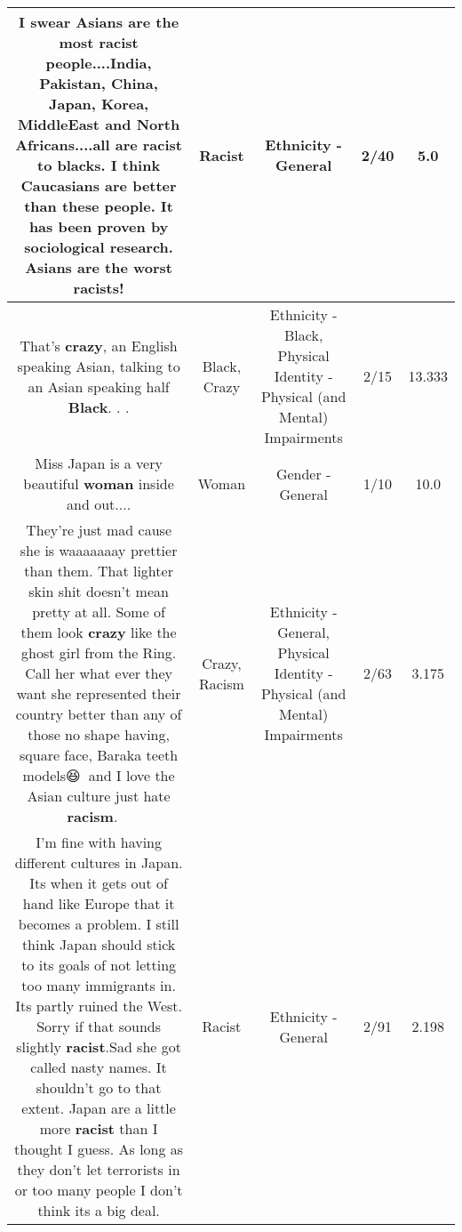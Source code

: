 \documentclass[11pt]{article}
\newlength\mylength
\begin{document}
\begin{center}
\begin{longtable}{|C{.65\mylength}|C{.30\mylength}|C{.12\mylength}|C{.12\mylength}|C{.12\mylength}|}
  \small I swear Asians are the most \textbf{racist} people....India, Pakistan, China, Japan, Korea, MiddleEast and North Africans....all are \textbf{racist} to blacks. I think Caucasians are better than these people. It has been proven by sociological research. Asians are the worst racists!\normalsize   & Racist & Ethnicity - General & 2/40 & 5.0 \\  \hline
  \small That's \textbf{crazy}, an English speaking Asian, talking to an Asian speaking half \textbf{Black}. . .\normalsize   & Black, Crazy & Ethnicity - Black, Physical Identity - Physical (and Mental) Impairments & 2/15 & 13.333 \\  \hline
  \small Miss Japan is a  very beautiful \textbf{woman} inside and out....\normalsize   & Woman & Gender - General & 1/10 & 10.0 \\  \hline
  \small They're just mad cause she is waaaaaaay prettier than them. That lighter skin shit doesn't mean pretty at all. Some of them look \textbf{crazy} like the ghost girl from the Ring. Call her what ever they want she represented their country better than any of those no shape having, square face, Baraka teeth models😆🤣🤓and I love the Asian culture just hate \textbf{racism}. 🤞🏾\normalsize   & Crazy, Racism & Ethnicity - General, Physical Identity - Physical (and Mental) Impairments & 2/63 & 3.175 \\  \hline
  \small I'm fine with having different cultures in Japan.  Its when it gets out of hand like Europe that it becomes a problem.  I still think Japan should stick to its goals of not letting too many immigrants in.  Its partly ruined the West.  Sorry if that sounds slightly \textbf{racist}.Sad she got called nasty names.  It shouldn't go to that extent.  Japan are a little more \textbf{racist} than I thought I guess.  As long as they don't let terrorists in or too many people I don't think its a big deal.\normalsize   & Racist & Ethnicity - General & 2/91 & 2.198 \\  \hline

\end{longtable}
\end{center}
\end{document}
